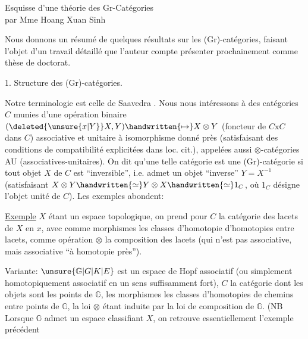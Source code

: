 
\begin{center}
Esquisse d'une théorie des Gr-Catégories\\
par Mme Hoang Xuan Sinh
\end{center}

Nous donnons un résumé de quelques résultats sur les (Gr)-catégories, faisant l'objet d'un travail détaillé que l'auteur compte présenter prochainement comme thèse de doctorat\handwritten{[\, ]}.

1. Structure des (Gr)-catégories.

Notre terminologie est celle de Saavedra \handwritten{[\, ]}. Nous nous intéressons à des catégories $C$ munies d'une opération binaire $(\deleted{\unsure{x|Y}}X,Y)\handwritten{\mapsto}X\otimes Y$ (foncteur de $C\mathbin{\mathrm{x}}C$ dans $C$) associative et unitaire à isomorphisme donné près (satisfaisant des conditions de compatibilité explicitées dans loc. cit.), appelées aussi $\otimes$-catégories AU (associatives-unitaires). On dit qu'une telle catégorie est une (Gr)-catégorie si  tout objet $X$ de $C$ est ``inversible'', i.e. admet un objet ``inverse'' $Y=X^{-1}$ (satisfaisant $X\otimes Y\handwritten{\simeq}Y\otimes X\handwritten{\simeq}1_C$, où $1_C$ désigne l'objet unité de $C$). Les exemples abondent:

\uline{Exemple}  $X$ étant un espace topologique, on prend pour $C$ la catégorie des lacets de $X$ en $x$, avec comme morphismes les classes d'homotopie d'homotopies entre lacets, comme opération $\otimes$ la composition des lacets (qui n'est pas associative, mais associative ``à homotopie près'').

Variante: $\unsure{\mathbb{G}|G|K|E}$ est un espace de Hopf associatif (ou simplement homotopiquement associatif en un sens suffisamment fort), $C$ la catégorie dont les objets sont les points de $\mathbb{G}$, les morphismes les classes d'homotopies de chemins entre points de $\mathbb{G}$, la loi $\otimes$ étant induite par la loi de composition de $\mathbb{G}$. (NB Lorsque $\mathbb{G}$ admet un espace classifiant $X$, on retrouve essentiellement l'exemple précédent

